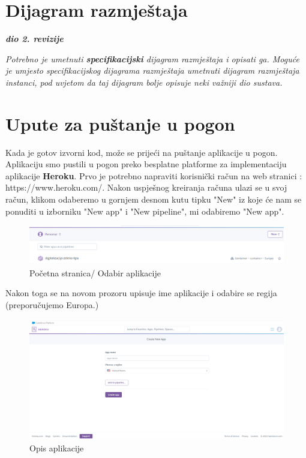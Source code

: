 			\eject 
		
		
		\section{Dijagram razmještaja}
			
			\textbf{\textit{dio 2. revizije}}
			
			 \textit{Potrebno je umetnuti \textbf{specifikacijski} dijagram razmještaja i opisati ga. Moguće je umjesto specifikacijskog dijagrama razmještaja umetnuti dijagram razmještaja instanci, pod uvjetom da taj dijagram bolje opisuje neki važniji dio sustava.}
			
			\eject 
		
		\section{Upute za puštanje u pogon}
		
				
			 \text Kada je gotov izvorni kod, može se prijeći na puštanje aplikacije u pogon. Aplikaciju smo pustili u pogon preko besplatne platforme za implementaciju aplikacije \textbf{Heroku}. Prvo je potrebno napraviti korisnički račun na web stranici : https://www.heroku.com/. Nakon uspješnog kreiranja računa ulazi se u svoj račun, klikom odaberemo u gornjem desnom kutu tipku "New" iz koje će nam se ponuditi u izborniku "New app" i "New pipeline", mi odabiremo "New app".
			 
			 \begin{figure}[H]
			 	\includegraphics[scale=0.5]{slike/odabir aplikacije.png} 
			 	\centering
			 	\caption{Početna stranica/ Odabir aplikacije}
			 	\label{DS}
			 \end{figure}
			 
			 Nakon toga se na novom prozoru upisuje ime aplikacije i odabire se regija (preporučujemo Europa.)
			 
			 \begin{figure}[H]
			 	\includegraphics[scale=0.4]{slike/opis aplikacije.png} 
			 	\centering
			 	\caption{Opis aplikacije}
			 	\label{DS}
			 \end{figure} 
			 
